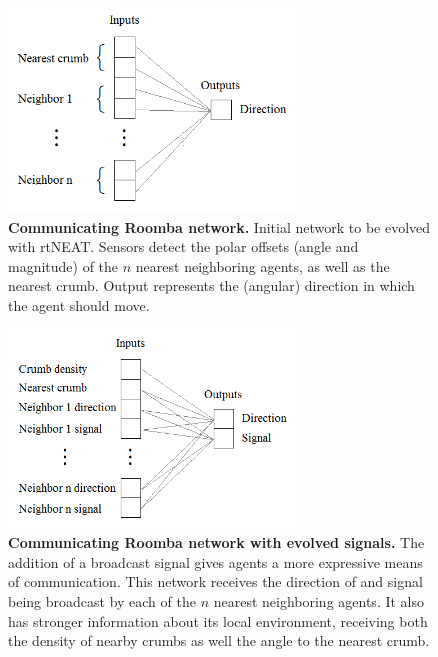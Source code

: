 \documentclass[conference]{IEEEtran}
\begin{document}
\begin{figure}[t]
\centering
\includegraphics[width=3.0in]{./figures/neroevolution/comm_network.png}
\caption{\textbf{Communicating Roomba network.} Initial network to be evolved with rtNEAT. Sensors detect the polar offsets (angle and magnitude) of the $n$ nearest neighboring agents, as well as the nearest crumb. Output represents the (angular) direction in which the agent should move.}
\label{neroevolution:communication}
\end{figure}

\begin{figure}[t]
\centering
\includegraphics[width=3.0in]{./figures/neroevolution/emerg_comm_network.png}
\caption{\textbf{Communicating Roomba network with evolved signals.} The addition of a broadcast signal gives agents a more expressive means of communication. This network receives the direction of and signal being broadcast by each of the $n$ nearest neighboring agents. It also has stronger information about its local environment, receiving both the density of nearby crumbs as well the angle to the nearest crumb.  }
\label{neroevolution:evolved_comunication}
\end{figure}
\end{document}
